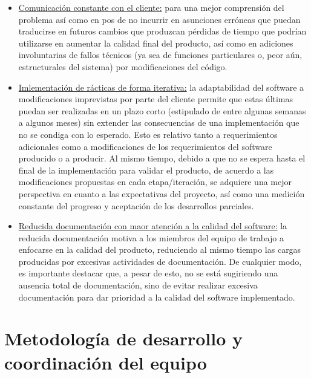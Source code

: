 \documentclass[a4paper, 12pt,twoside]{report}  %
\numberwithin{equation}{subsection} %
\begin{document}
\begin{itemize}
	\item \underline{Comunicación constante con el cliente:} para una mejor comprensión del problema así como en pos de no incurrir en asunciones erróneas que puedan traducirse en futuros cambios que produzcan pérdidas de tiempo que podrían utilizarse en aumentar la calidad final del producto, así como en adiciones involuntarias de fallos técnicos (ya sea de funciones particulares o, peor aún, estructurales del sistema) por modificaciones del código.
	\item \underline{Imlementación de rácticas de forma iterativa:} la adaptabilidad del software a modificaciones imprevistas por parte del cliente permite que estas últimas puedan ser realizadas en un plazo corto (estipulado de entre algunas semanas a algunos meses) sin extender las consecuencias de una implementación que no se condiga con lo esperado. Esto es relativo tanto a requerimientos adicionales como a modificaciones de los requerimientos del software producido o a producir. Al mismo tiempo, debido a que no se espera hasta el final de la implementación para validar el producto, de acuerdo a las modificaciones propuestas en cada etapa/iteración, se adquiere una mejor perspectiva en cuanto a las expectativas del proyecto, así como una medición constante del progreso y aceptación de los desarrollos parciales.
	\item \underline{Reducida documentación con maor atención a la calidad del software:} la reducida documentación motiva a los miembros del equipo de trabajo a enfocarse en la calidad del producto, reduciendo al mismo tiempo las cargas producidas por excesivas actividades de documentación. De cualquier modo, es importante destacar que, a pesar de esto, no se está sugiriendo una ausencia total de documentación, sino de evitar realizar excesiva documentación para dar prioridad a la calidad del software implementado.
\end{itemize}

\section{Metodología de desarrollo y coordinación del equipo}
\end{document}
